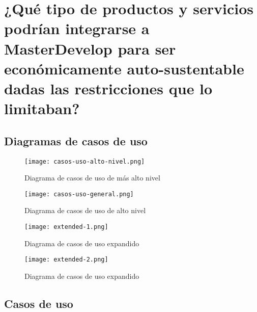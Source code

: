 \documentclass{article}
\begin{document}
\section{¿Qué tipo de productos y servicios podrían 
integrarse a MasterDevelop para ser económicamente 
auto-sustentable dadas las restricciones que lo limitaban?}

\subsection{Diagramas de casos de uso}
\begin{figure}[ht]
	\centering
        \texttt{[image: casos-uso-alto-nivel.png]}
                 \caption{Diagrama de casos de uso de más alto nivel}
\end{figure}	
\clearpage
\begin{figure}[ht]
        \texttt{[image: casos-uso-general.png]}
                 \caption{Diagrama de casos de uso de alto nivel}
\end{figure}	

\clearpage

\begin{figure}[ht]
	\centering
        \texttt{[image: extended-1.png]}
                 \caption{Diagrama de casos de uso expandido}
\end{figure}	

\begin{figure}[ht]
	\centering
        \texttt{[image: extended-2.png]}
                 \caption{Diagrama de casos de uso expandido}
\end{figure}	

\subsection{Casos de uso}
\end{document}
